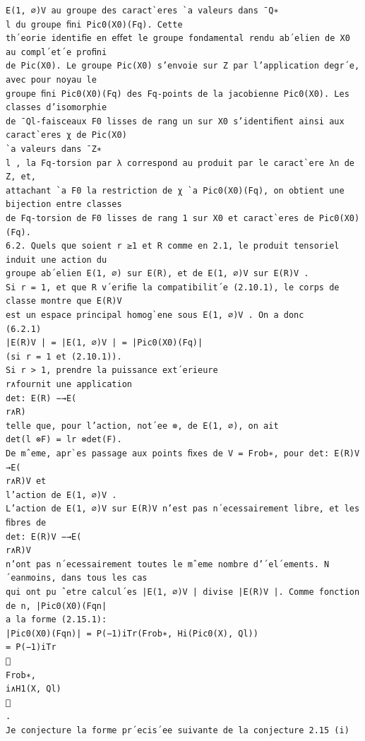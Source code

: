 \documentclass[11pt]{article}
\begin{document}
\begin{Verbatim}[breaklines=true,fontsize=\small]
E(1, ∅)V au groupe des caract`eres `a valeurs dans ¯Q∗
l du groupe ﬁni Pic0(X0)(Fq). Cette
th´eorie identiﬁe en eﬀet le groupe fondamental rendu ab´elien de X0 au compl´et´e proﬁni
de Pic(X0). Le groupe Pic(X0) s’envoie sur Z par l’application degr´e, avec pour noyau le
groupe ﬁni Pic0(X0)(Fq) des Fq-points de la jacobienne Pic0(X0). Les classes d’isomorphie
de ¯Ql-faisceaux F0 lisses de rang un sur X0 s’identiﬁent ainsi aux caract`eres χ de Pic(X0)
`a valeurs dans ¯Z∗
l , la Fq-torsion par λ correspond au produit par le caract`ere λn de Z, et,
attachant `a F0 la restriction de χ `a Pic0(X0)(Fq), on obtient une bijection entre classes
de Fq-torsion de F0 lisses de rang 1 sur X0 et caract`eres de Pic0(X0)(Fq).
6.2. Quels que soient r ≥1 et R comme en 2.1, le produit tensoriel induit une action du
groupe ab´elien E(1, ∅) sur E(R), et de E(1, ∅)V sur E(R)V .
Si r = 1, et que R v´eriﬁe la compatibilit´e (2.10.1), le corps de classe montre que E(R)V
est un espace principal homog`ene sous E(1, ∅)V . On a donc
(6.2.1)
|E(R)V | = |E(1, ∅)V | = |Pic0(X0)(Fq)|
(si r = 1 et (2.10.1)).
Si r > 1, prendre la puissance ext´erieure
r∧fournit une application
det: E(R) −→E(
r∧R)
telle que, pour l’action, not´ee ⊗, de E(1, ∅), on ait
det(l ⊗F) = lr ⊗det(F).
De mˆeme, apr`es passage aux points ﬁxes de V = Frob∗, pour det: E(R)V →E(
r∧R)V et
l’action de E(1, ∅)V .
L’action de E(1, ∅)V sur E(R)V n’est pas n´ecessairement libre, et les ﬁbres de
det: E(R)V −→E(
r∧R)V
n’ont pas n´ecessairement toutes le mˆeme nombre d’´el´ements. N´eanmoins, dans tous les cas
qui ont pu ˆetre calcul´es |E(1, ∅)V | divise |E(R)V |. Comme fonction de n, |Pic0(X0)(Fqn|
a la forme (2.15.1):
|Pic0(X0)(Fqn)| = P(−1)iTr(Frob∗, Hi(Pic0(X), Ql))
= P(−1)iTr

Frob∗,
i∧H1(X, Ql)

.
Je conjecture la forme pr´ecis´ee suivante de la conjecture 2.15 (i)


\end{Verbatim}
\end{document}
